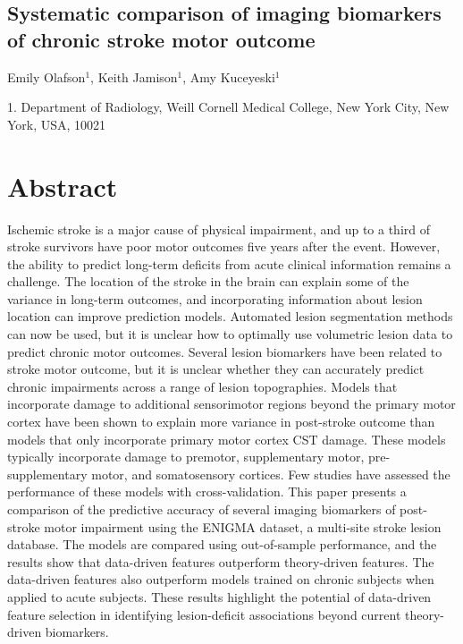 \documentclass[10pt]{article}
\begin{document}
 

\begin{center}
{\large \section*{Systematic comparison of imaging biomarkers of chronic stroke motor outcome }}
\end{center}

\begin{center}
Emily Olafson$^1$, Keith Jamison$^1$, Amy Kuceyeski$^1$
\end{center}

    1. \textmd{Department of Radiology, Weill Cornell Medical College, New York City, New York, USA, 10021} 



\section{Abstract}
Ischemic stroke is a major cause of physical impairment, and up to a third of stroke survivors have poor motor outcomes five years after the event. However, the ability to predict long-term deficits from acute clinical information remains a challenge. The location of the stroke in the brain can explain some of the variance in long-term outcomes, and incorporating information about lesion location can improve prediction models. Automated lesion segmentation methods can now be used, but it is unclear how to optimally use volumetric lesion data to predict chronic motor outcomes. Several lesion biomarkers have been related to stroke motor outcome, but it is unclear whether they can accurately predict chronic impairments across a range of lesion topographies. Models that incorporate damage to additional sensorimotor regions beyond the primary motor cortex have been shown to explain more variance in post-stroke outcome than models that only incorporate primary motor cortex CST damage. These models typically incorporate damage to premotor, supplementary motor, pre-supplementary motor, and somatosensory cortices. Few studies have assessed the performance of these models with cross-validation. This paper presents a comparison of the predictive accuracy of several imaging biomarkers of post-stroke motor impairment using the ENIGMA dataset, a multi-site stroke lesion database. The models are compared using out-of-sample performance, and the results show that data-driven features outperform theory-driven features. The data-driven features also outperform models trained on chronic subjects when applied to acute subjects. These results highlight the potential of data-driven feature selection in identifying lesion-deficit associations beyond current theory-driven biomarkers.
\end{document}
